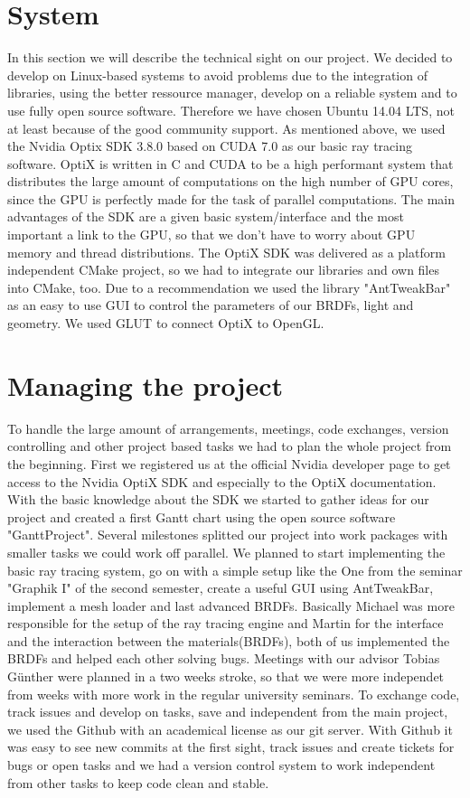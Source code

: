 \documentclass[11pt,a4paper]{article}
\begin{document}
\section{System}
\label{sec:System}
In this section we will describe the technical sight on our project. We decided to develop on Linux-based systems to avoid problems due to the integration of libraries, using the better ressource manager, develop on a reliable system and to use fully open source software. Therefore we have chosen Ubuntu 14.04 LTS, not at least because of the good community support. As mentioned above, we used the Nvidia Optix SDK 3.8.0 based on CUDA 7.0 as our basic ray tracing software. OptiX is written in C and CUDA to be a high performant system that distributes the large amount of computations on the high number of GPU cores, since the GPU is perfectly made for the task of parallel computations. The main advantages of the SDK are a given basic system/interface and the most important a link to the GPU, so that we don't have to worry about GPU memory and thread distributions. The OptiX SDK was delivered as a platform independent CMake project, so we had to integrate our libraries and own files into CMake, too. 
Due to a recommendation we used the library "AntTweakBar" as an easy to use GUI to control the parameters of our BRDFs, light and geometry. We used GLUT to connect OptiX to OpenGL.


\newpage
\section{Managing the project}
\label{sec:management}
To handle the large amount of arrangements, meetings, code exchanges, version controlling and other project based tasks we had to plan the whole project from the beginning. First we registered us at the official Nvidia developer page to get access to the Nvidia OptiX SDK and especially to the OptiX documentation. With the basic knowledge about the SDK we started to gather ideas for our project and created a first Gantt chart using the open source software "GanttProject". Several milestones splitted our project into work packages with smaller tasks we could work off parallel. We planned to start implementing the basic ray tracing system, go on with a simple setup like the One from the seminar "Graphik I" of the second semester, create a useful GUI using AntTweakBar, implement a mesh loader and last advanced BRDFs. Basically Michael was more responsible for the setup of the ray tracing engine and Martin for the interface and the interaction between the materials(BRDFs), both of us implemented the BRDFs and helped each other solving bugs. Meetings with our advisor Tobias Günther were planned in a two weeks stroke, so that we were more independet from weeks with more work in the regular university seminars. To exchange code, track issues and develop on tasks, save and independent from the main project, we used the Github with an academical license as our git server. With Github it was easy to see new commits at the first sight, track issues and create tickets for bugs or open tasks and we had a version control system to work independent from other tasks to keep code clean and stable.
\end{document}
